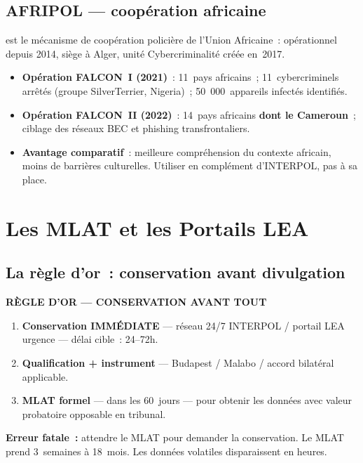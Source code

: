 \subsection{AFRIPOL --- coopération africaine}

 est le mécanisme de coopération policière
de l'Union Africaine~: opérationnel depuis 2014, siège à Alger, unité
Cybercriminalité créée en~2017.

\begin{itemize}
    \item \textbf{Opération FALCON~I (2021)}~: 11~pays africains~;
          11~cybercriminels arrêtés (groupe SilverTerrier, Nigeria)~;
          50~000~appareils infectés identifiés.
    \item \textbf{Opération FALCON~II (2022)}~: 14~pays africains
          \textbf{dont le Cameroun}~; ciblage des réseaux BEC et
          phishing transfrontaliers.
    \item \textbf{Avantage comparatif}~: meilleure compréhension du
          contexte africain, moins de barrières culturelles. Utiliser
          en complément d'INTERPOL, pas à sa place.
\end{itemize}

\section{Les MLAT et les Portails LEA}
\label{sec:mlat-lea}

\subsection{La règle d'or~: conservation avant divulgation}

\begin{boxalert}
\textbf{RÈGLE D'OR --- CONSERVATION AVANT TOUT}
\begin{enumerate}
    \item \textbf{Conservation IMMÉDIATE} --- réseau 24/7 INTERPOL /
          portail LEA urgence --- délai cible~: 24--72h.
    \item \textbf{Qualification + instrument} --- Budapest / Malabo /
          accord bilatéral applicable.
    \item \textbf{MLAT formel} --- dans les 60~jours --- pour obtenir
          les données avec valeur probatoire opposable en tribunal.
\end{enumerate}
\textbf{Erreur fatale~:} attendre le MLAT pour demander la conservation.
Le MLAT prend 3~semaines à 18~mois. Les données volatiles disparaissent
en heures.
\end{boxalert}

